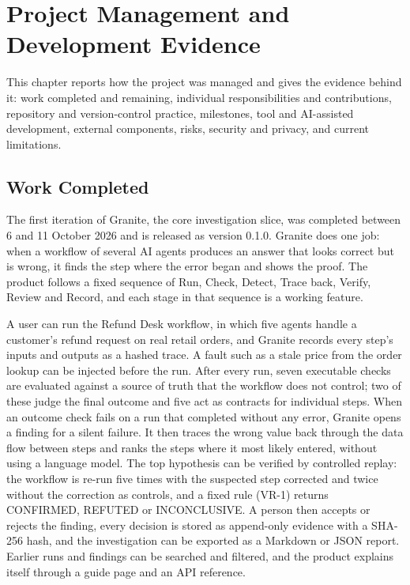 \chapter{Project Management and Development Evidence}

This chapter reports how the project was managed and gives the evidence behind it: work completed and remaining, individual responsibilities and contributions, repository and version-control practice, milestones, tool and AI-assisted development, external components, risks, security and privacy, and current limitations.

\section{Work Completed}

The first iteration of Granite, the core investigation slice, was completed between 6 and 11 October 2026 and is released as version 0.1.0. Granite does one job: when a workflow of several AI agents produces an answer that looks correct but is wrong, it finds the step where the error began and shows the proof. The product follows a fixed sequence of Run, Check, Detect, Trace back, Verify, Review and Record, and each stage in that sequence is a working feature.

A user can run the Refund Desk workflow, in which five agents handle a customer's refund request on real retail orders, and Granite records every step's inputs and outputs as a hashed trace. A fault such as a stale price from the order lookup can be injected before the run. After every run, seven executable checks are evaluated against a source of truth that the workflow does not control; two of these judge the final outcome and five act as contracts for individual steps. When an outcome check fails on a run that completed without any error, Granite opens a finding for a silent failure. It then traces the wrong value back through the data flow between steps and ranks the steps where it most likely entered, without using a language model. The top hypothesis can be verified by controlled replay: the workflow is re-run five times with the suspected step corrected and twice without the correction as controls, and a fixed rule (VR-1) returns CONFIRMED, REFUTED or INCONCLUSIVE. A person then accepts or rejects the finding, every decision is stored as append-only evidence with a SHA-256 hash, and the investigation can be exported as a Markdown or JSON report. Earlier runs and findings can be searched and filtered, and the product explains itself through a guide page and an API reference.

